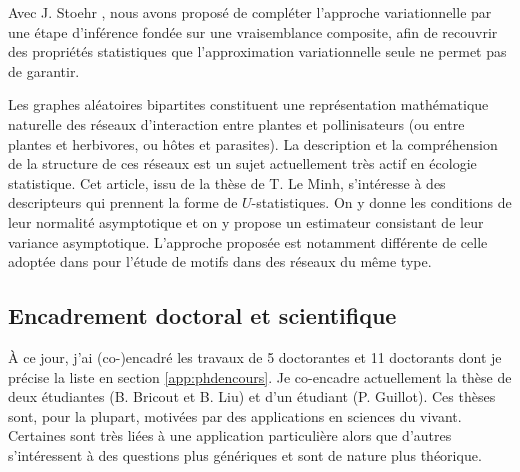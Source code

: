 \begin{description}
  Avec J. Stoehr \cite{StR26}, nous avons proposé de compléter l’approche variationnelle par une étape d’inférence fondée sur une vraisemblance composite, afin de recouvrir des propriétés statistiques que l’approximation variationnelle seule ne permet pas de garantir.
  \item[\cite{LDM25} {\sl Electronic Journal of Statistics, 2025}.] 
  Les graphes aléatoires bipartites constituent une représentation mathématique naturelle des réseaux d'interaction entre plantes et pollinisateurs (ou entre plantes et herbivores, ou hôtes et parasites). La description et la compréhension de la structure de ces réseaux est un sujet actuellement très actif en écologie statistique. Cet article, issu de la thèse de T. Le Minh, s'intéresse à des descripteurs qui prennent la forme de $U$-statistiques. On y donne les conditions de leur normalité asymptotique et on y propose un estimateur consistant de leur variance asymptotique. L'approche proposée est notamment différente de celle adoptée dans \cite{OLR22} pour l'étude de motifs dans des réseaux du même type.
\end{description}

\subsection{Encadrement doctoral et scientifique}

À ce jour, j'ai (co-)encadré les travaux de 5 doctorantes et 11 doctorants dont je précise la liste en section \ref{app:phdencours}. Je co-encadre actuellement la thèse de deux étudiantes (B. Bricout et B. Liu) et d'un étudiant (P. Guillot). Ces thèses sont, pour la plupart, motivées par des applications en sciences du vivant. Certaines sont très liées à une application particulière alors que d’autres s'intéressent à des questions plus génériques et sont de nature plus théorique.

